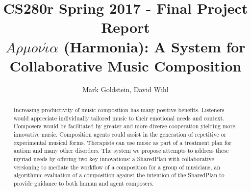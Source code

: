 \documentclass[final,authoryear,5p,times,twocolumn]{elsarticle}
\begin{document}
\begin{frontmatter}



\title{CS280r Spring 2017 - Final Project Report \\ $A \rho \mu o \nu \acute{\iota} \alpha$ (Harmonia): A System for Collaborative Music Composition}


\author{Mark Goldstein, David Wihl}
\address{\{markgoldstein,davidwihl\}@g.harvard.edu}

\begin{abstract}

Increasing productivity of music composition has many positive benefits. Listeners
would appreciate individually tailored music to their emotional needs and context.
Composers would be facilitated by greater and more diverse cooperation yielding more
innovative music. Composition agents could assist in the generation of repetitive or 
experimental musical forms. Therapists can use music as part of a treatment plan 
for autism and
many other disorders. The system we propose attempts to address these myriad needs 
by offering two key innovations: a SharedPlan with collaborative versioning to mediate the workflow of a composition for a group of musicians, an algorithmic evaluation of a composition against the intention of the
SharedPlan to provide guidance to both human and agent composers.

\end{abstract}
\end{frontmatter}

\end{document}

